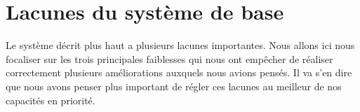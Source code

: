 \documentclass[journal]{IEEEtran}
\begin{document}
%
%



%


\section{Lacunes du système de base}
\label{lacunes}

Le système décrit plus haut a plusieurs lacunes importantes. Nous allons ici nous focaliser sur les trois principales faiblesses qui nous ont empêcher de réaliser correctement plusieurs améliorations auxquels nous avions pensés. Il va s'en dire que nous avons penser plus important de régler ces lacunes au meilleur de nos capacités en priorité.
\end{document}
